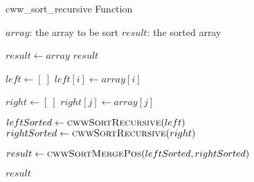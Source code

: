             \begin{frame}[containsverbatim]{\cwwsortrecursivefunctionframe}
                \begingroup
                    \makeatletter
                    \renewcommand{\alglinenumber}[1]{\tiny#1}
                    \makeatother
                    \begin{algorithm}[H]
                        \tiny
                        \caption{cww\_sort\_recursive Function} \label{cww_sort_recursive function}
                        \begin{multicols}{2}
                            \begin{algorithmic}[1]
                                \Require 
                                    \Statex $array$: the array to be sort
                                \Ensure
                                    \Statex $result$: the sorted array
                                \Statex
                
                                        \State $result \gets array$
                                        \State \Return $result$
                                    \EndIf

                                    \State $left \gets \left[\ \right]$
                                        \State $left{\left[i\right]} \gets array{\left[i\right]}$
                                    \EndFor

                                    \State $right \gets\left[\ \right]$
                                        \State $right{\left[j\right]} \gets array{\left[j\right]}$
                                    \EndFor

                                    \State $leftSorted \gets \Call{cwwSortRecursive}{left}$
                                    \State $rightSorted \gets \Call{cwwSortRecursive}{right}$

                                    \State $result \gets \Call{cwwSortMergePos}{leftSorted, rightSorted}$
        
                                    \State \Return $result$
                                \EndFunction
                            \end{algorithmic}
                        \end{multicols}
                    \end{algorithm}
                \endgroup
            \end{frame}

